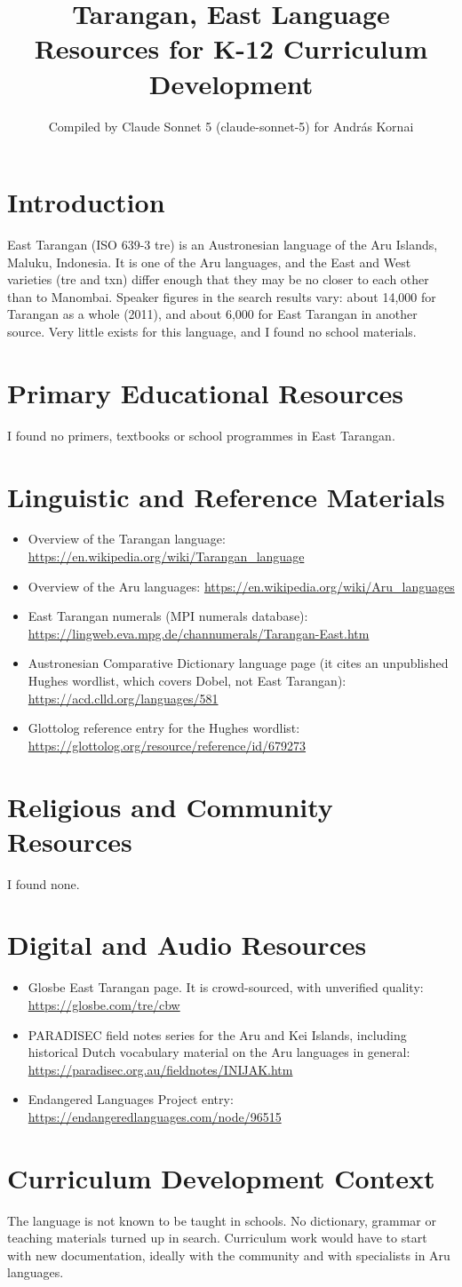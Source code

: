 \documentclass[12pt]{article}
\title{Tarangan, East Language Resources for K-12 Curriculum Development}
\author{Compiled by Claude Sonnet 5 (claude-sonnet-5) for Andr\'as Kornai}
\date{}
\begin{document}
\maketitle
\section{Introduction}
East Tarangan (ISO 639-3 tre) is an Austronesian language of the Aru Islands, Maluku, Indonesia. It is one of the Aru languages, and the East and West varieties (tre and txn) differ enough that they may be no closer to each other than to Manombai. Speaker figures in the search results vary: about 14,000 for Tarangan as a whole (2011), and about 6,000 for East Tarangan in another source. Very little exists for this language, and I found no school materials.
\section{Primary Educational Resources}
I found no primers, textbooks or school programmes in East Tarangan.
\section{Linguistic and Reference Materials}
\begin{itemize}
\item Overview of the Tarangan language: \url{https://en.wikipedia.org/wiki/Tarangan_language}
\item Overview of the Aru languages: \url{https://en.wikipedia.org/wiki/Aru_languages}
\item East Tarangan numerals (MPI numerals database): \url{https://lingweb.eva.mpg.de/channumerals/Tarangan-East.htm}
\item Austronesian Comparative Dictionary language page (it cites an unpublished Hughes wordlist, which covers Dobel, not East Tarangan): \url{https://acd.clld.org/languages/581}
\item Glottolog reference entry for the Hughes wordlist: \url{https://glottolog.org/resource/reference/id/679273}
\end{itemize}
\section{Religious and Community Resources}
I found none.
\section{Digital and Audio Resources}
\begin{itemize}
\item Glosbe East Tarangan page. It is crowd-sourced, with unverified quality: \url{https://glosbe.com/tre/cbw}
\item PARADISEC field notes series for the Aru and Kei Islands, including historical Dutch vocabulary material on the Aru languages in general: \url{https://paradisec.org.au/fieldnotes/INIJAK.htm}
\item Endangered Languages Project entry: \url{https://endangeredlanguages.com/node/96515}
\end{itemize}
\section{Curriculum Development Context}
The language is not known to be taught in schools. No dictionary, grammar or teaching materials turned up in search. Curriculum work would have to start with new documentation, ideally with the community and with specialists in Aru languages.
\end{document}
